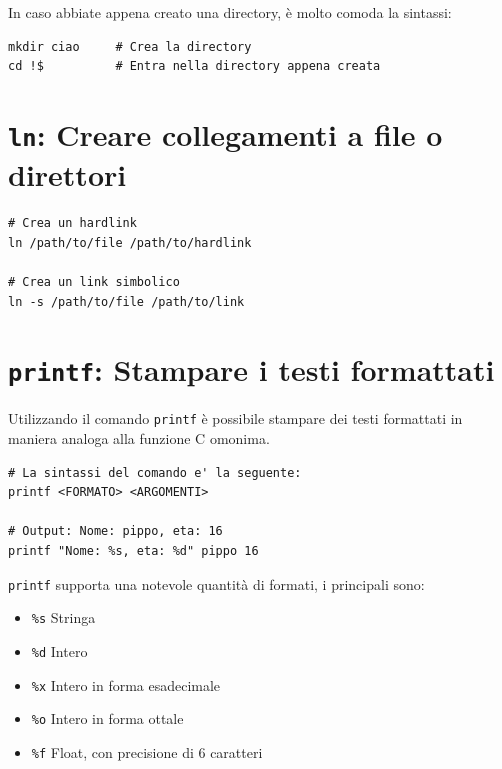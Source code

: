 \documentclass[a4paper]{report}
\newenvironment{info}{\begin{tcolorbox}[fonttitle=\sffamily\bfseries\large,title=Info,colframe=blue!75!white]}{\end{tcolorbox}}
\newenvironment{code}{\begin{tcolorbox}[size=small]}{\end{tcolorbox}}
\begin{document}
\begin{info}
In caso abbiate appena creato una directory, è molto comoda la sintassi:
\begin{lstlisting}
mkdir ciao     # Crea la directory
cd !$          # Entra nella directory appena creata
\end{lstlisting}
\end{info}

\section{\texttt{ln}: Creare collegamenti a file o direttori}

\begin{code}
\begin{lstlisting}
# Crea un hardlink
ln /path/to/file /path/to/hardlink

# Crea un link simbolico
ln -s /path/to/file /path/to/link
\end{lstlisting}
\end{code}

\section{\texttt{printf}: Stampare i testi formattati}

Utilizzando il comando \texttt{printf} è possibile stampare dei testi formattati in maniera analoga alla funzione C omonima.

\begin{code}
\begin{lstlisting}
# La sintassi del comando e' la seguente:
printf <FORMATO> <ARGOMENTI>

# Output: Nome: pippo, eta: 16
printf "Nome: %s, eta: %d" pippo 16
\end{lstlisting}
\end{code}

\texttt{printf} supporta una notevole quantità di formati, i principali sono:

\begin{itemize}
	\item \texttt{\%s} Stringa
	\item \texttt{\%d} Intero
	\item \texttt{\%x} Intero in forma esadecimale
	\item \texttt{\%o} Intero in forma ottale
	\item \texttt{\%f} Float, con precisione di 6 caratteri
\end{itemize}
\end{document}
